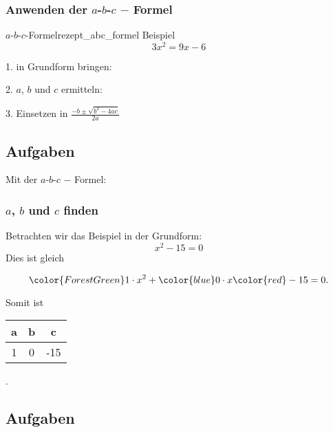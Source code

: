 \subsubsection{Anwenden der $a$-$b$-$c$ $-$ Formel}
\begin{rezept}{$a$-$b$-$c$-Formel}{rezept_abc_formel}
  Beispiel $$3x^2 = 9x - 6$$

  1. in Grundform bringen: 


2. $a$, $b$ und $c$ ermitteln:


3. Einsetzen in \large{ $\frac{-b \pm \sqrt{b^2-4ac}}{2a}$}

\end{rezept}

\subsection*{Aufgaben}
Mit der $a$-$b$-$c$ $-$ Formel:
\newpage


\subsubsection{$a$, $b$ und $c$ finden}
Betrachten wir das Beispiel in der Grundform:
$$x^2 - 15 = 0$$
Dies ist gleich

$$ {\color{ForestGreen}1\cdot{}}  x^2 + {\color{blue}0\cdot{}} x{\color{red} -15} = 0.$$
  
Somit ist
\begin{tabular}{|c|c|c|}
    {\color{ForestGreen}a} & {\color{blue}b} &  {\color{red}  c} \\\hline
    {\color{ForestGreen}1} & {\color{blue}0} &  {\color{red}-15}
\end{tabular}.

\subsection*{Aufgaben}

